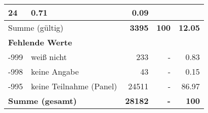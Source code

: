 \begin{longtable}{lXrrr}
       \num{24} &
       \num[round-mode=places,round-precision=2]{0.71} &
         \num[round-mode=places,round-precision=2]{0.09} \\
     \midrule
     \multicolumn{2}{l}{Summe (gültig)} &
       \textbf{\num{3395}} &
     \textbf{100} &
       \textbf{\num[round-mode=places,round-precision=2]{12.05}} \\
     \multicolumn{5}{l}{\textbf{Fehlende Werte}}\\
       -999 &
       weiß nicht &
         \num{233} &
        - &
         \num[round-mode=places,round-precision=2]{0.83} \\
       -998 &
       keine Angabe &
         \num{43} &
        - &
         \num[round-mode=places,round-precision=2]{0.15} \\
       -995 &
       keine Teilnahme (Panel) &
         \num{24511} &
        - &
         \num[round-mode=places,round-precision=2]{86.97} \\
     \midrule
     \multicolumn{2}{l}{\textbf{Summe (gesamt)}} &
          \textbf{\num{28182}} &
        \textbf{-} &
        \textbf{100} \\
     \bottomrule
     \end{longtable}
     
